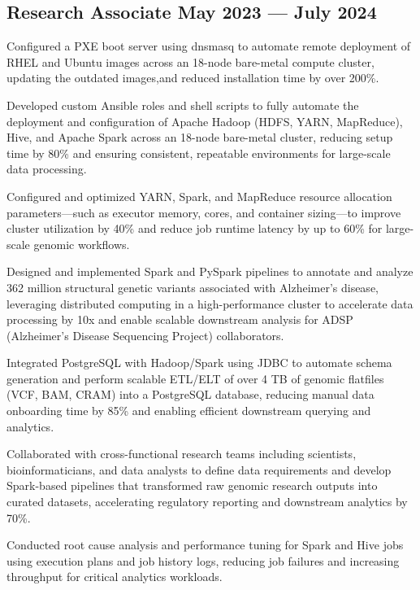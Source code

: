 \subsection{{Research Associate \hfill May 2023 --- July 2024}}
\begin{zitemize}
\item Configured a PXE boot server using dnsmasq to automate remote deployment of RHEL and Ubuntu images across an 18-node bare-metal compute cluster, updating the outdated images,and reduced installation time by over 200\%.
\item Developed custom Ansible roles and shell scripts to fully automate the deployment and configuration of Apache Hadoop (HDFS, YARN, MapReduce), Hive, and Apache Spark across an 18-node bare-metal cluster, reducing setup time by 80\% and ensuring consistent, repeatable environments for large-scale data processing.
\item Configured and optimized YARN, Spark, and MapReduce resource allocation parameters—such as executor memory, cores, and container sizing—to improve cluster utilization by 40\% and reduce job runtime latency by up to 60\% for large-scale genomic workflows.
\item Designed and implemented Spark and PySpark pipelines to annotate and analyze 362 million structural genetic variants associated with Alzheimer’s disease, leveraging distributed computing in a high-performance cluster to accelerate data processing by 10x and enable scalable downstream analysis for ADSP (Alzheimer's Disease Sequencing Project) collaborators.
\item  Integrated PostgreSQL with Hadoop/Spark using JDBC to automate schema generation and perform scalable ETL/ELT of over 4 TB of genomic flatfiles (VCF, BAM, CRAM) into a PostgreSQL database, reducing manual data onboarding time by 85\% and enabling efficient downstream querying and analytics.
\item Collaborated with cross-functional research teams including scientists, bioinformaticians, and data analysts to define data requirements and develop Spark-based pipelines that transformed raw genomic research outputs into curated datasets, accelerating regulatory reporting and downstream analytics by 70\%.
\item Conducted root cause analysis and performance tuning for Spark and Hive jobs using execution plans and job history logs, reducing job failures and increasing throughput for critical analytics workloads.

\end{zitemize}
